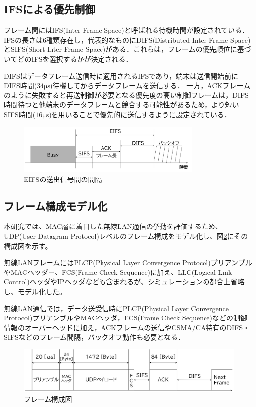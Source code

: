 \documentclass[a4paper,10pt]{ltjsarticle}
\begin{document}
\clearpage

\subsection{IFSによる優先制御}

フレーム間にはIFS(Inter Frame Space)と呼ばれる待機時間が設定されている．IFSの長さは6種類存在し，代表的なものにDIFS(Distributed Inter Frame Space)とSIFS(Short Inter Frame Space)がある．これらは，フレームの優先順位に基づいてどのIFSを選択するかが決定される．

DIFSはデータフレーム送信時に適用されるIFSであり，端末は送信開始前にDIFS時間($34\mathrm{\mu s}$)待機してからデータフレームを送信する．
一方，ACKフレームのように失敗すると再送制御が必要となる優先度の高い制御フレームは，DIFS時間待つと他端末のデータフレームと競合する可能性があるため，より短いSIFS時間($16\mathrm{\mu s}$)を用いることで優先的に送信するように設定されている．

\begin{figure}[H]
  \centering
  \includegraphics[width=0.8\textwidth]{./assets/EIFS.png}
  \caption{EIFSの送出信号間の間隔}
  \label{eifs}
\end{figure}


\subsection{フレーム構成モデル化}

本研究では、MAC層に着目した無線LAN通信の挙動を評価するため、UDP(User Datagram Protocol)レベルのフレーム構成をモデル化し、図\ref{packet}にその構成図を示す。

無線LANフレームにはPLCP(Physical Layer Convergence Protocol)プリアンブルやMACヘッダー、FCS(Frame Check Sequence)に加え、LLC(Logical Link Control)ヘッダやIPヘッダなども含まれるが、シミュレーションの都合上省略し、モデル化した。

無線LAN通信では，データ送受信時にPLCP(Physical Layer Convergence Protocol)プリアンブルやMACヘッダ，FCS(Frame Check Sequence)などの制御情報のオーバーヘッドに加え，ACKフレームの送信やCSMA/CA特有のDIFS・SIFSなどのフレーム間隔，バックオフ動作も必要となる．

\begin{figure}[H]
  \centering
  \includegraphics[width=1\columnwidth]{./assets/packet.png}
  \caption{フレーム構成図}
  \label{packet}
\end{figure}
\end{document}
